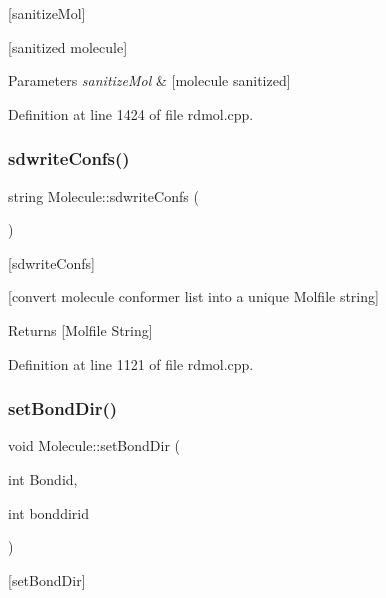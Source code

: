 \mbox{[}sanitize\+Mol\mbox{]} 

\mbox{[}sanitized molecule\mbox{]}


\begin{DoxyParams}{Parameters}
{\em sanitize\+Mol} & \mbox{[}molecule sanitized\mbox{]} \\
\hline
\end{DoxyParams}


Definition at line 1424 of file rdmol.\+cpp.

\mbox{\label{class_molecule_a4c3f4a82ffe6453c231d78aef0af5efd}} 
\subsubsection{\texorpdfstring{sdwrite\+Confs()}{sdwriteConfs()}}
{\footnotesize\ttfamily string Molecule\+::sdwrite\+Confs (\begin{DoxyParamCaption}{ }\end{DoxyParamCaption})}



\mbox{[}sdwrite\+Confs\mbox{]} 

\mbox{[}convert molecule conformer list into a unique Molfile string\mbox{]} \begin{DoxyReturn}{Returns}
\mbox{[}Molfile String\mbox{]} 
\end{DoxyReturn}


Definition at line 1121 of file rdmol.\+cpp.

\mbox{\label{class_molecule_a21ccf25eb7aa1fb6c5827a7c6c01d926}} 
\subsubsection{\texorpdfstring{set\+Bond\+Dir()}{setBondDir()}}
{\footnotesize\ttfamily void Molecule\+::set\+Bond\+Dir (\begin{DoxyParamCaption}\item[{int}]{Bondid,  }\item[{int}]{bonddirid }\end{DoxyParamCaption})}



\mbox{[}set\+Bond\+Dir\mbox{]} 

